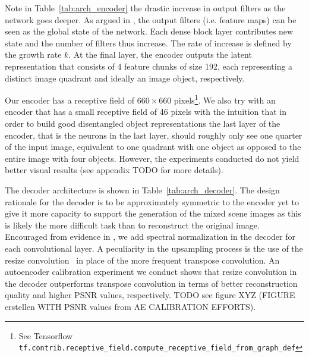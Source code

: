 \documentclass[12pt,a4paper]{article}
\begin{document}
Note in Table~\ref{tab:arch_encoder} the drastic increase in output filters as the network goes deeper. As argued in \cite{DenseNet}, the output filters (i.e. feature maps) can be seen as the global state of the network. Each dense block layer contributes new state and the number of filters thus increase. The rate of increase is defined by the growth rate $k$. At the final layer, the encoder outputs the latent representation that consists of 4 feature chunks of size 192, each representing a distinct image quadrant and ideally an image object, respectively.

Our encoder has a receptive field of $660 \times 660$ pixels\footnote{See Tensorflow \texttt{tf.contrib.receptive\_field.compute\_receptive\_field\_from\_graph\_def}}. We also try with an encoder that has a small receptive field of 46 pixels with the intuition that in order to build good disentangled object representations the last layer of the encoder, that is the neurons in the last layer, should roughly only see one quarter of the input image, equivalent to one quadrant with one object as opposed to the entire image with four objects. However, the experiments conducted do not yield better visual results (see appendix TODO for more details).

The decoder architecture is shown in Table~\ref{tab:arch_decoder}. The design rationale for the decoder is to be approximately symmetric to the encoder yet to give it more capacity to support the generation of the mixed scene images as this is likely the more difficult task than to reconstruct the original image. Encouraged from evidence in \cite{SAGAN}, we add spectral normalization in the decoder for each convolutional layer. A peculiarity in the upsampling process is the use of the resize convolution~\cite{ResizeConv} in place of the more frequent transpose convolution. An autoencoder calibration experiment we conduct shows that resize convolution in the decoder outperforms transpose convolution in terms of better reconstruction quality and higher PSNR values, respectively. TODO see figure XYZ (FIGURE erstellen WITH PSNR values from AE CALIBRATION EFFORTS).
\end{document}
